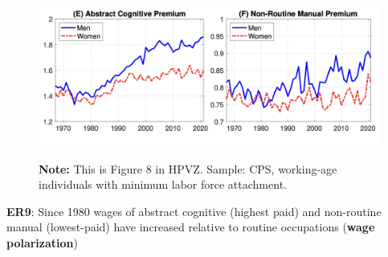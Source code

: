 \documentclass[11pt, aspectratio=169]{beamer}
\begin{document}
\begin{frame}{}
	\begin{figure}
		\includegraphics[scale=0.4]{./figures/inequality_polarization_3}
	\vspace*{-2mm}
	\begin{flushleft}
		{\scriptsize \hspace{6mm} \textbf{Note:} This is Figure 8 in HPVZ. Sample: CPS, working-age individuals with minimum labor force attachment.}
	\end{flushleft}	
	\end{figure}

	\vspace{2mm}
	{\color{blue}\textbf{ER9}}: Since 1980 wages of abstract cognitive (highest paid) and non-routine manual (lowest-paid) have increased relative to routine occupations (\textbf{wage polarization}) 
\end{frame}
\end{document}
